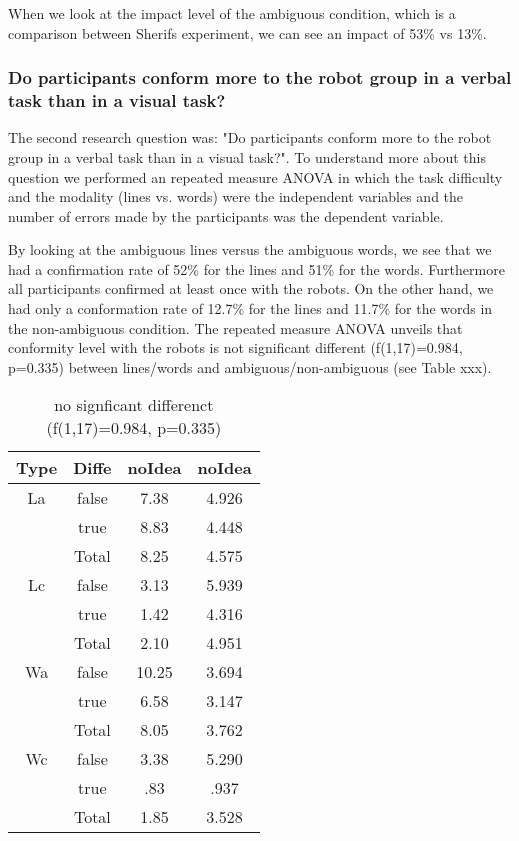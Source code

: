 \documentclass{acm_proc_article-sp}
\begin{document}
When we look at the impact level of the ambiguous condition, which is a comparison between Sherifs experiment, we can see an impact of 53\% vs 13\%.

\subsubsection{Do participants conform more to the robot group in a verbal task than in a visual task?}
The second research question was: "Do participants conform more to the robot group in a verbal task than in a visual task?". To understand more about this question we performed an repeated measure ANOVA in which the task difficulty and the modality (lines vs. words) were the independent variables and the number of errors made by the participants was the dependent variable.

By looking at the ambiguous lines versus the ambiguous words, we see that we had a confirmation rate of 52\% for the lines and 51\% for the words. Furthermore all participants confirmed at least once with the robots. On the other hand, we had only a conformation rate of 12.7\% for the lines and 11.7\% for the words in the non-ambiguous condition. The repeated measure ANOVA unveils that conformity level with the robots is not significant different (f(1,17)=0.984, p=0.335) between lines/words and ambiguous/non-ambiguous (see Table xxx). 


\begin{table}
\centering
\caption{no signficant differenct (f(1,17)=0.984, p=0.335)}
\begin{tabular}{|c|c|c|c|} \hline
Type & Diffe & noIdea & noIdea\\ \hline
La  & false &   7.38 &  4.926\\ \hline
    & true  &    8.83 &	4.448\\ \hline
	& Total &	8.25 &	4.575\\ \hline
Lc	& false &	3.13 &	5.939\\ \hline
	& true	&   1.42 &	4.316\\ \hline
	& Total	&   2.10 &	4.951\\ \hline
Wa	& false	&   10.25&	3.694\\ \hline
	& true	&   6.58 &	3.147\\ \hline
	& Total	&   8.05 &	3.762\\ \hline
Wc	& false	&   3.38 &	5.290\\ \hline
	& true	&   .83	 &  .937\\ \hline
	& Total	&   1.85 &	3.528\\ \hline
\hline\end{tabular}
\end{table}
\end{document}
